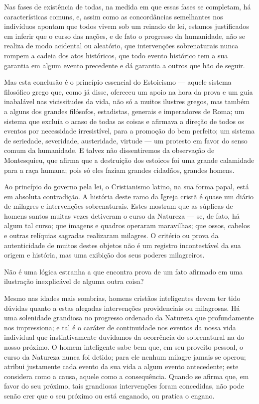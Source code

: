 \documentclass[11pt,a5paper,twoside,openany]{book}
\begin{document}
Nas fases de existência de todas, na medida em que essas fases se completam, há características comuns, e, assim como as concordâncias semelhantes nos indivíduos apontam que todos vivem sob um reinado de lei, estamos justificados em inferir que o curso das nações, e de fato o progresso da humanidade, não se realiza de modo acidental ou aleatório, que intervenções sobrenaturais nunca rompem a cadeia dos atos históricos, que todo evento histórico tem a sua garantia em algum evento precedente e dá garantia a outros que hão de seguir.

Mas esta conclusão é o princípio essencial do Estoicismo — aquele sistema filosófico grego que, como já disse, ofereceu um apoio na hora da prova e um guia inabalável nas vicissitudes da vida, não só a muitos ilustres gregos, mas também a alguns dos grandes filósofos, estadistas, generais e imperadores de Roma; um sistema que excluía o acaso de todas as coisas e afirmava a direção de todos os eventos por necessidade irresistível, para a promoção do bem perfeito; um sistema de seriedade, severidade, austeridade, virtude — um protesto em favor do senso comum da humanidade. E talvez não dissentiremos da observação de Montesquieu, que afirma que a destruição dos estoicos foi uma grande calamidade para a raça humana; pois só eles faziam grandes cidadãos, grandes homens.

Ao princípio do governo pela lei, o Cristianismo latino, na sua forma papal, está em absoluta contradição. A história deste ramo da Igreja cristã é quase um diário de milagres e intervenções sobrenaturais. Estes mostram que as súplicas de homens santos muitas vezes detiveram o curso da Natureza — se, de fato, há algum tal curso; que imagens e quadros operaram maravilhas; que ossos, cabelos e outras relíquias sagradas realizaram milagres. O critério ou prova da autenticidade de muitos destes objetos não é um registro incontestável da sua origem e história, mas uma exibição dos seus poderes milagreiros.

Não é uma lógica estranha a que encontra prova de um fato afirmado em uma ilustração inexplicável de alguma outra coisa?

Mesmo nas idades mais sombrias, homens cristãos inteligentes devem ter tido dúvidas quanto a estas alegadas intervenções providenciais ou milagrosas. Há uma solenidade grandiosa no progresso ordenado da Natureza que profundamente nos impressiona; e tal é o caráter de continuidade nos eventos da nossa vida individual que instintivamente duvidamos da ocorrência do sobrenatural na do nosso próximo. O homem inteligente sabe bem que, em seu proveito pessoal, o curso da Natureza nunca foi detido; para ele nenhum milagre jamais se operou; atribui justamente cada evento da sua vida a algum evento antecedente; este considera como a causa, aquele como a consequência. Quando se afirma que, em favor do seu próximo, tais grandiosas intervenções foram concedidas, não pode senão crer que o seu próximo ou está enganado, ou pratica o engano.
\end{document}

